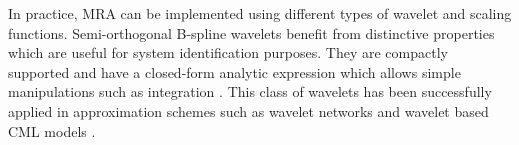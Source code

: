 \documentclass[11pt,draftcls,onecolumn,peerreview]{IEEEtran}
\begin{document}






In practice, MRA can be implemented using different types of wavelet and scaling functions. Semi-orthogonal B-spline wavelets \cite{Chui1992,Unser1993} benefit from distinctive properties which are useful for system identification purposes. They are compactly supported and have a closed-form analytic expression which allows simple manipulations such as integration \cite{Unser1992,Chui1992a}. This class of wavelets has been successfully applied in approximation schemes such as wavelet networks\cite{G.P.Liu2000,Jun2005} and wavelet based CML models \cite{Billings2006}. 
\end{document}
